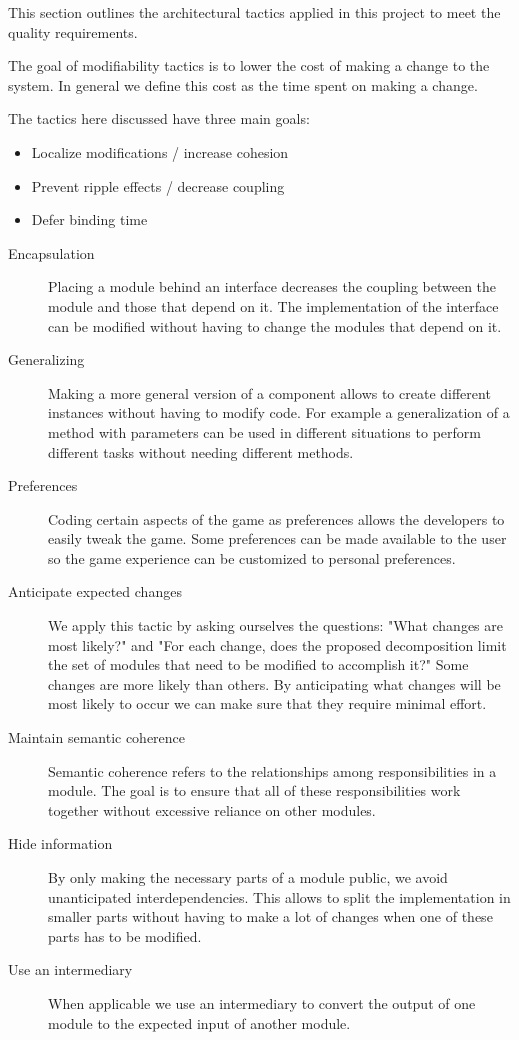 This section outlines the architectural tactics applied in this project to meet the quality requirements.

	The goal of modifiability tactics is to lower the cost of making a change to the system. In general we define this cost as the time spent on making a change.

	The tactics here discussed have three main goals:
	\begin{itemize}
		\item Localize modifications / increase cohesion
		\item Prevent ripple effects / decrease coupling
		\item Defer binding time
	\end{itemize}

	\begin{description}
		\item [Encapsulation]
			Placing a module behind an interface decreases the coupling between the module and those that depend on it. The implementation of the interface can be modified without having to change the modules that depend on it.
		\item [Generalizing]
			Making a more general version of a component allows to create different instances without having to modify code. For example a generalization of a method with parameters can be used in different situations to perform different tasks without needing different methods.
		\item [Preferences]
			Coding certain aspects of the game as preferences allows the developers to easily tweak the game. Some preferences can be made available to the user so the game experience can be customized to personal preferences.
		\item [Anticipate expected changes]
			We apply this tactic by asking ourselves the questions: "What changes are most likely?" and "For each change, does the proposed decomposition limit the set of modules that need to be modified to accomplish it?" Some changes are more likely than others. By anticipating what changes will be most likely to occur we can make sure that they require minimal effort.
		\item [Maintain semantic coherence]
			Semantic coherence refers to the relationships among responsibilities in a module. The goal is to ensure that all of these responsibilities work together without excessive reliance on other modules.
		\item [Hide information]
			By only making the necessary parts of a module public, we avoid unanticipated interdependencies. This allows to split the implementation in smaller parts without having to make a lot of changes when one of these parts has to be modified.
		\item [Use an intermediary]
		When applicable we use an intermediary to convert the output of one module to the expected input of another module.
	\end{description}


